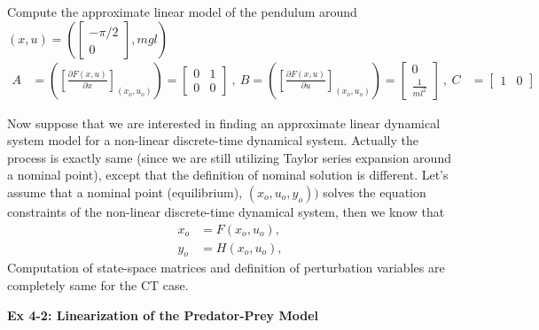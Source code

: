 \documentclass[twoside]{article}
\begin{document}
%
Compute the approximate linear model of the pendulum around $(x,u) =
\left( \left[ \begin{array}{c} -\pi/2 \\ 0 \end{array} \right] , m g l \right)$
%
\begin{align*}
A &= \left( \left[ \frac{\partial F(x,u)}{\partial x}
                      \right]_{(x_o,u_o)} \right) =
                    \left[ \begin{array}{cc} 0 & 1 \\ 0 & 0 \end{array}  \right]
\ , \ B = \left( \left[ \frac{\partial F(x,u)}{\partial u}
                      \right]_{(x_o,u_o)} \right) =
                                                            \left[ \begin{array}{c}
                                                                     0
                                                                     \\
                                                                     \frac{1}{m
                                                                     l^2}  \end{array}  \right]
\ , \
C &= \left[ \begin{array}{cc} 1 & 0 \end{array}  \right]
\end{align*}

Now suppose that we are interested in finding an approximate linear
dynamical system model for a non-linear discrete-time dynamical
system. Actually the process is exactly same (since we are still
utilizing Taylor series expansion around a nominal point), except that 
the definition of nominal solution is different. Let's assume that 
a nominal point (equilibrium), $(x_o,u_o,y_o))$ solves the equation
constraints of the non-linear discrete-time dynamical system, then 
we know that
\begin{align*}
  x_o &= F(x_o,u_o) , \\
  y_o &= H(x_o,u_o) , 
\end{align*}
%
Computation of state-space matrices and definition of perturbation
variables are completely same for the CT case. 
%

\vspace{12pt}

\textbf{Ex 4-2: Linearization of the Predator-Prey Model}
\end{document}
